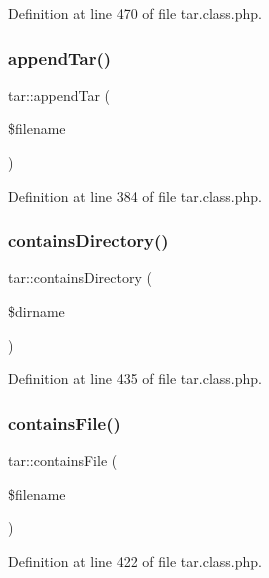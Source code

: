 Definition at line 470 of file tar.\+class.\+php.

\mbox{\label{classtar_a3c35ee6b05a860a0108afa5853db4070}} 
\subsubsection{\texorpdfstring{append\+Tar()}{appendTar()}}
{\footnotesize\ttfamily tar\+::append\+Tar (\begin{DoxyParamCaption}\item[{}]{\$filename }\end{DoxyParamCaption})}



Definition at line 384 of file tar.\+class.\+php.

\mbox{\label{classtar_aff90f763b61b935c856eb7e634a2c0a7}} 
\subsubsection{\texorpdfstring{contains\+Directory()}{containsDirectory()}}
{\footnotesize\ttfamily tar\+::contains\+Directory (\begin{DoxyParamCaption}\item[{}]{\$dirname }\end{DoxyParamCaption})}



Definition at line 435 of file tar.\+class.\+php.

\mbox{\label{classtar_ac7ba975f7bcf57d9a8167feb7122933e}} 
\subsubsection{\texorpdfstring{contains\+File()}{containsFile()}}
{\footnotesize\ttfamily tar\+::contains\+File (\begin{DoxyParamCaption}\item[{}]{\$filename }\end{DoxyParamCaption})}



Definition at line 422 of file tar.\+class.\+php.

